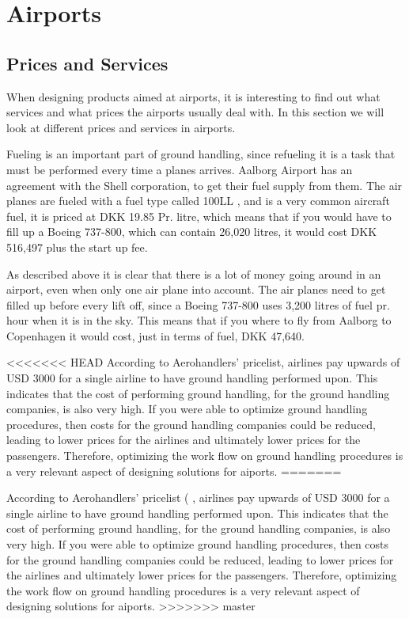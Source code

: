 \chapter{Airports}
\section{Prices and Services}
When designing products aimed at airports, it is interesting to find out what services and what prices the airports usually deal with. In this section we will look at different prices and services in airports.


Fueling is an important part of ground handling, since refueling it is a task that must be performed every time a planes arrives. Aalborg Airport has an agreement with the Shell corporation, to get their fuel supply from them. The air planes are fueled with a fuel type called 100LL \cite{iaopa_fuelprices}, and is a very common aircraft fuel, it is priced at DKK 19.85 Pr. litre, which means that if you would have to fill up a Boeing 737-800, which can contain 26,020 litres\cite{737_specs}, it would cost DKK 516,497 plus the start up fee.

As described above it is clear that there is a lot of money going around in an airport, even when only one air plane into account. The air planes need to get filled up before every lift off, since a Boeing 737-800 uses 3,200 litres of fuel pr. hour when it is in the sky. This means that if you where to fly from Aalborg to Copenhagen it would cost, just in terms of fuel, DKK 47,640.

<<<<<<< HEAD
According to Aerohandlers' pricelist\cite{PaS_AeroHandlers}, airlines pay upwards of USD 3000 for a single airline to have ground handling performed upon. This indicates that the cost of performing ground handling, for the ground handling companies, is also very high. If you were able to optimize ground handling procedures, then costs for the ground handling companies could be reduced, leading to lower prices for the airlines and ultimately lower prices for the passengers. Therefore, optimizing the work flow on ground handling procedures is a very relevant aspect of designing solutions for aiports.
=======

According to Aerohandlers' pricelist (%
, airlines pay upwards of USD 3000 for a single airline to have ground handling performed upon. This indicates that the cost of performing ground handling, for the ground handling companies, is also very high. If you were able to optimize ground handling procedures, then costs for the ground handling companies could be reduced, leading to lower prices for the airlines and ultimately lower prices for the passengers. Therefore, optimizing the work flow on ground handling procedures is a very relevant aspect of designing solutions for aiports.
>>>>>>> master

